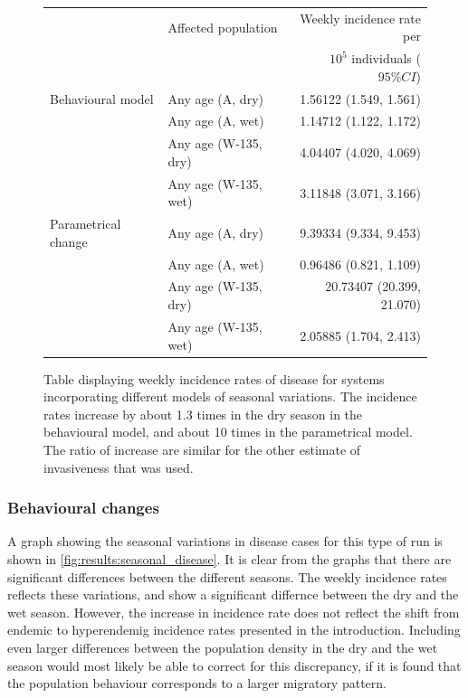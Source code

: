 \documentclass[10pt,a4paper]{article}
\begin{document}
\begin{figure}
	\begin{tabular}{l|l|r}
								& Affected population				& Weekly incidence rate per			\\
								&									& $10^5$ individuals ($95\% CI$)	\\ \hline
		Behavioural model		& Any age (A, dry)					& 1.56122 (1.549, 1.561)			\\
								& Any age (A, wet)					& 1.14712 (1.122, 1.172)			\\
								& Any age (W-135, dry)				& 4.04407 (4.020, 4.069)			\\
								& Any age (W-135, wet)				& 3.11848 (3.071, 3.166)			\\
		Parametrical change		& Any age (A, dry)					& 9.39334 (9.334, 9.453)			\\
								& Any age (A, wet)					& 0.96486 (0.821, 1.109)			\\
								& Any age (W-135, dry)				& 20.73407 (20.399, 21.070)			\\
								& Any age (W-135, wet)				& 2.05885 (1.704, 2.413)			\\ \hline
	\end{tabular}
	\caption{Table displaying weekly incidence rates of disease for systems incorporating different models of seasonal variations. The incidence rates increase by about 1.3 times in the dry season in the behavioural model, and about 10 times in the parametrical model. The ratio of increase are similar for the other estimate of invasiveness that was used.} \label{table:results:incidence_seasonal}
\end{figure}

\subsubsection{Behavioural changes}

A graph showing the seasonal variations in disease cases for this type of run is shown in \cref{fig:results:seasonal_disease}. It is clear from the graphs that there are significant differences between the different seasons. The weekly incidence rates reflects these variations, and show a significant differnce between the dry and the wet season. However, the increase in incidence rate does not reflect the shift from endemic to hyperendemig incidence rates presented in the introduction. Including even larger differences between the population density in the dry and the wet season would most likely be able to correct for this discrepancy, if it is found that the population behaviour corresponds to a larger migratory pattern.
\end{document}
